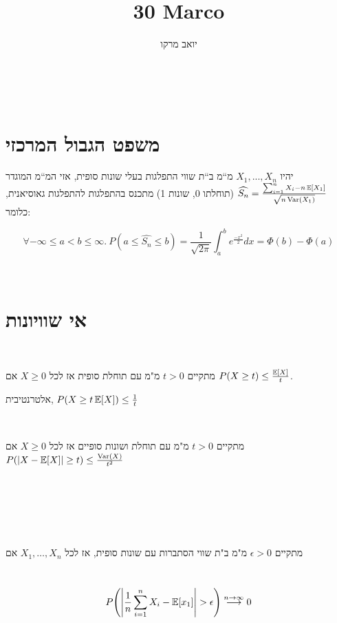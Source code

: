 \documentclass[8pt,twocolumn]{extarticle}
\title{30 Marco}
\author{יואב מרקו}
\begin{document}
‏\section{משפט הגבול המרכזי}
יהיו $X_{1},...,X_{n}$ מ“מ ב“ת שווי התפלגות בעלי שונות
סופית, אזי המ“מ המוגדר $\widehat{S_{n}}=\frac{\sum_{i=1}^{n}X_{i}-n\EX\left[X_{1}\right]}{\sqrt{n\Var\left(X_{1}\right)}}$
(תוחלתו 0, שונות 1) מתכנס בהתפלגות להתפלגות גאוסיאנית, כלומר:

\[\forall -\infty\leq a<b\leq\infty.\
  P\left(a\leq\widehat{S_{n}}\leq b\right)=\frac{1}{\sqrt{2\pi}}\int_{a}^{b}e^{\frac{-x^{2}}{2}}dx=\varPhi\left(b\right)-\varPhi\left(a\right)\]

‏\section{אי שוויונות} ‏\begin{claim}[א"ש מרקוב]
  אם ‎\(X\geq 0\) מ"מ עם תוחלת סופית אז לכל ‎\(t>0\) מתקיים
  ‎\(P(X\geq t)\\ \leq  \frac{\operatorname*{\mathbb{E}}[X]}{t}\).

  אלטרנטיבית, ‎\(P(X \geq t \operatorname*{\mathbb{E}}[X]) \leq \frac{1}{t}\) ‏\end{claim}
‏\begin{claim}[א"ש צ'בישב] אם ‎\(X\geq 0\) מ"מ עם תוחלת ושונות סופיים
  אז לכל ‎\(t>0\) מתקיים ‎\( P(\abs{X - \EX[X]} \geq t) \leq \frac{\Var(X)}{t^2} \)
  ‏\end{claim}
‏ \begin{claim}
‏
‏\end{claim}
‏\begin{theorem}
אם ‎\(X_1, \dots ,X_n\) מ"מ ב"ת שווי הסתברות עם שונות סופית, אז לכל ‎\(\epsilon >0\) מתקיים

‎\[ P\left(\abs{\frac{1}{n} \sum_{i=1}^n X_i - \EX[x_1]} > \epsilon\right) \overset{n\to \infty}{\longrightarrow} 0 \]
‏\end{theorem}
\end{document}
